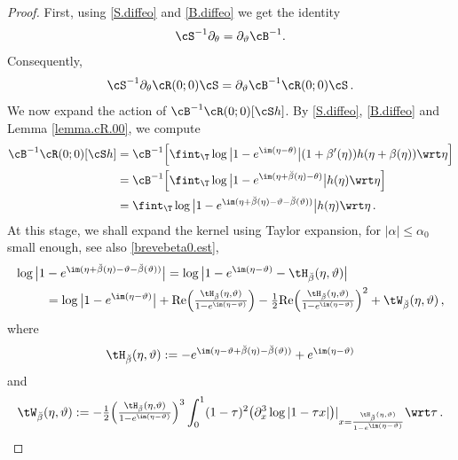 \documentclass[a4paper,reqno,10pt]{article}
\newcommand{\pa}{\partial}
\begin{document}
\begin{proof}
	First, using  \eqref{S.diffeo} and \eqref{B.diffeo} we get the identity
	$$
		\cS^{-1} \pa_{\theta} =\pa_{\vartheta} \cB^{-1}.
	$$
	Consequently,
	\begin{equation}\label{lunch1}
		\cS^{-1} \pa_{\theta} \cR(0;0) \cS = \pa_{\vartheta} \cB^{-1} \cR(0;0) \cS \,.
	\end{equation}
We now expand the action of  $\cB^{-1}\cR(0;0)[ \cS  h  ]$. 
By  \eqref{S.diffeo}, \eqref{B.diffeo} and Lemma \ref{lemma.cR.00}, we compute
	\begin{align}
		\cB^{-1}  \cR(0;0) [\cS h] & = \cB^{-1} \Big[ \fint_{\T}  \log\big| 1-e^{\im(\eta-\theta)}  \big| (1+\beta'(\eta)) h(\eta+\beta(\eta))  \wrt\eta  \Big]   \\
		& = \cB^{-1} \Big[  \fint_{\T}  \log\big| 1-e^{\im(\eta +\breve{\beta}(\eta)-\theta)}  \big| h(\eta)  \wrt\eta \Big]  \\
		& = \fint_{\T}  \log\big| 1-e^{\im(\eta +\breve{\beta}(\eta)-\vartheta-\breve{\beta}(\vartheta))}  \big| h(\eta)  \wrt\eta \,.
	\end{align}
At this stage, we shall  expand the kernel using Taylor expansion, for $|\alpha|\leq \alpha_{0} $ small enough, see also \eqref{brevebeta0.est},
\begin{equation}\label{rain1}
	\begin{aligned}
		\log\big| 1&-e^{\im(\eta +\breve{\beta}(\eta)-\vartheta-\breve{\beta}(\vartheta))}  \big| = \log \big| 1- e^{\im(\eta-\vartheta)} - \tH_{\breve{\beta}}(\eta,\vartheta) \big| \\
		&= \log\big| 1-e^{\im(\eta -\vartheta)}\big|  + {\rm Re} \Big( \tfrac{\tH_{\breve{\beta}}(\eta,\vartheta)}{1-e^{\im(\eta-\vartheta)}}  \Big) - \tfrac12  {\rm Re}  \Big( \tfrac{\tH_{\breve{\beta}}(\eta,\vartheta)}{1-e^{\im(\eta-\vartheta)}} \Big)^2   + \tW_{\breve{\beta}}(\eta,\vartheta) \,,
	\end{aligned}
\end{equation}
where
$$
		\tH_{\breve{\beta}} (\eta,\vartheta)  := -e^{\im(\eta -\vartheta +\breve{\beta}(\eta)-\breve{\beta}(\vartheta))} + e^{\im(\eta-\vartheta)}
$$
and
\begin{equation}
	\tW_{\breve{\beta}}(\eta,\vartheta) := - \tfrac12 \Big( \tfrac{\tH_{\breve{\beta}}(\eta,\vartheta)}{1-e^{\im(\eta-\vartheta)}} \Big)^3\int_{0}^{1} (1-\tau)^2 \big( \pa_{x}^3 \log|1-\tau x| \big)|_{x=\frac{\tH_{\breve{\beta}}(\eta,\vartheta)}{1-e^{\im(\eta-\vartheta)}}} \wrt \tau \,  .

\end{equation}
\end{proof}
\end{document}
